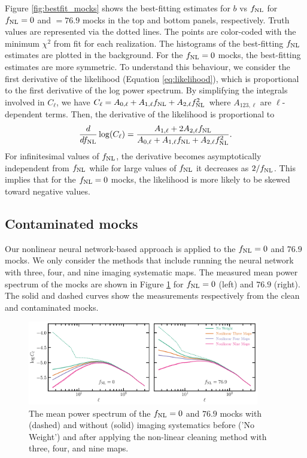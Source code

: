 Figure \ref{fig:bestfit_mocks} shows the best-fitting estimates for $b$ vs $f_{\rm NL}$ for $f_{\rm NL}=0$ and $=76.9$ mocks in the top and bottom panels, respectively. Truth values are represented via the dotted lines. The points are color-coded with the minimum $\chi^{2}$ from fit for each realization. The histograms of the best-fitting $f_{\rm NL}$ estimates are plotted in the background. For the $f_{\rm NL}=0$ mocks, the best-fitting estimates are more symmetric. To understand this behaviour, we consider the first derivative of the likelihood (Equation \ref{eq:likelihood}), which is proportional to the first derivative of the log power spectrum. By simplifying the integrals involved in $C_{\ell}$, we have $C_{\ell} = A_{0, \ell} + A_{1,\ell} f_{\rm NL} + A_{2, \ell} f_{\rm NL}^{2}$ where $A_{123,\ell}$ are $\ell$-dependent terms. Then, the derivative of the likelihood is proportional to
\begin{equation}
    \frac{d}{df_{\rm NL}}\log(C_{\ell}) = \frac{A_{1, \ell}+2A_{2, \ell}f_{\rm NL}}{A_{0, \ell} + A_{1,\ell} f_{\rm NL} + A_{2, \ell} f_{\rm NL}^{2}}.
\end{equation}
For infinitesimal values of $f_{\rm NL}$, the derivative becomes asymptotically independent from $f_{\rm NL}$ while for large values of $f_{\rm NL}$ it decreases as $2/f_{\rm NL}$. This implies that for the $f_{\rm NL}=0$ mocks, the likelihood is more likely to be skewed toward negative values.


\subsection{Contaminated mocks}\label{ssec:contmocks}
Our nonlinear neural network-based approach is applied to the $f_{\rm NL}=0$ and $76.9$ mocks. We only consider the methods that include running the neural network with three, four, and nine imaging systematic maps. The measured mean power spectrum of the mocks are shown in Figure \ref{fig:clmocks} for $f_{\rm NL}=0$ (left) and $76.9$ (right). The solid and dashed curves show the measurements respectively from the clean and contaminated mocks.

\begin{figure}
    \centering
    \includegraphics[width=0.9\textwidth]{figures/clmocks.pdf}
    \caption{The mean power spectrum of the $f_{\rm NL} =0$ and $76.9$ mocks with (dashed) and without (solid) imaging systematics before ('No Weight') and after applying the non-linear cleaning method with three, four, and nine maps.}\label{fig:clmocks}
\end{figure}


